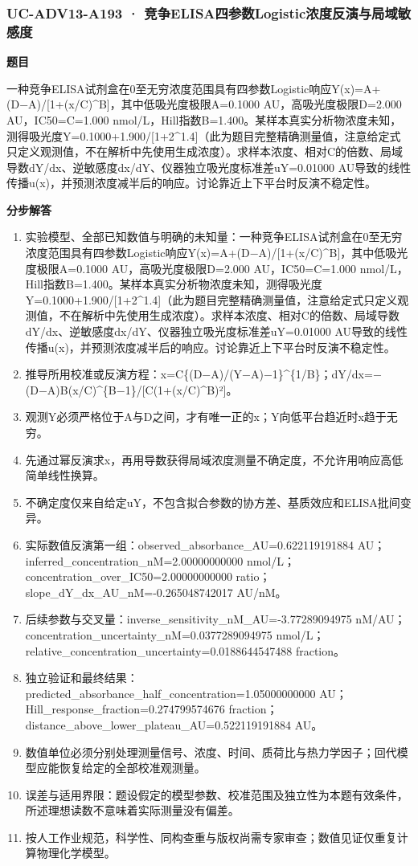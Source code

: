 \documentclass[UTF8,11pt,a4paper]{ctexart}
\begin{document}
\subsubsection*{UC-ADV13-A193 · 竞争ELISA四参数Logistic浓度反演与局域敏感度}
\noindent\textbf{题目}\par
一种竞争ELISA试剂盒在0至无穷浓度范围具有四参数Logistic响应Y(x)=A+(D−A)/[1+(x/C)\textasciicircum{}B]，其中低吸光度极限A=0.1000 AU，高吸光度极限D=2.000 AU，IC50=C=1.000 nmol/L，Hill指数B=1.400。某样本真实分析物浓度未知，测得吸光度Y=0.1000+1.900/[1+2\textasciicircum{}1.4]（此为题目完整精确测量值，注意给定式只定义观测值，不在解析中先使用生成浓度）。求样本浓度、相对C的倍数、局域导数dY/dx、逆敏感度dx/dY、仪器独立吸光度标准差uY=0.01000 AU导致的线性传播u(x)，并预测浓度减半后的响应。讨论靠近上下平台时反演不稳定性。\par
\medskip\noindent\textbf{分步解答}
\begin{enumerate}
\item 实验模型、全部已知数值与明确的未知量：一种竞争ELISA试剂盒在0至无穷浓度范围具有四参数Logistic响应Y(x)=A+(D−A)/[1+(x/C)\textasciicircum{}B]，其中低吸光度极限A=0.1000 AU，高吸光度极限D=2.000 AU，IC50=C=1.000 nmol/L，Hill指数B=1.400。某样本真实分析物浓度未知，测得吸光度Y=0.1000+1.900/[1+2\textasciicircum{}1.4]（此为题目完整精确测量值，注意给定式只定义观测值，不在解析中先使用生成浓度）。求样本浓度、相对C的倍数、局域导数dY/dx、逆敏感度dx/dY、仪器独立吸光度标准差uY=0.01000 AU导致的线性传播u(x)，并预测浓度减半后的响应。讨论靠近上下平台时反演不稳定性。
\item 推导所用校准或反演方程：x=C\{(D−A)/(Y−A)−1\}\textasciicircum{}\{1/B\}；dY/dx=−(D−A)B(x/C)\textasciicircum{}\{B−1\}/[C(1+(x/C)\textasciicircum{}B)²]。
\item 观测Y必须严格位于A与D之间，才有唯一正的x；Y向低平台趋近时x趋于无穷。
\item 先通过幂反演求x，再用导数获得局域浓度测量不确定度，不允许用响应高低简单线性换算。
\item 不确定度仅来自给定uY，不包含拟合参数的协方差、基质效应和ELISA批间变异。
\item 实际数值反演第一组：observed\_absorbance\_AU=0.622119191884 AU；inferred\_concentration\_nM=2.00000000000 nmol/L；concentration\_over\_IC50=2.00000000000 ratio；slope\_dY\_dx\_AU\_nM=-0.265048742017 AU/nM。
\item 后续参数与交叉量：inverse\_sensitivity\_nM\_AU=-3.77289094975 nM/AU；concentration\_uncertainty\_nM=0.0377289094975 nmol/L；relative\_concentration\_uncertainty=0.0188644547488 fraction。
\item 独立验证和最终结果：predicted\_absorbance\_half\_concentration=1.05000000000 AU；Hill\_response\_fraction=0.274799574676 fraction；distance\_above\_lower\_plateau\_AU=0.522119191884 AU。
\item 数值单位必须分别处理测量信号、浓度、时间、质荷比与热力学因子；回代模型应能恢复给定的全部校准观测量。
\item 误差与适用界限：题设假定的模型参数、校准范围及独立性为本题有效条件，所述理想读数不意味着实际测量没有偏差。
\item 按人工作业规范，科学性、同构查重与版权尚需专家审查；数值见证仅重复计算物理化学模型。
\end{enumerate}
\end{document}
